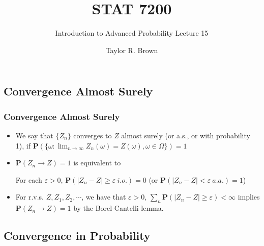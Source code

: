 \documentclass[handout]{beamer}
\title{STAT 7200}
\subtitle{Introduction to Advanced Probability \newline Lecture 15}
\author{Taylor R. Brown}
\institute{}
\date{}
\newcommand{\BP}{\mathbf{P}}
\begin{document}
\frame{\titlepage}

\section[Outline]{}
\frame{\tableofcontents}


\subsection{Convergence Almost Surely}


\frame
{
  \frametitle{Convergence Almost Surely}

   \begin{itemize}
       \item<1-> We say that $\{Z_n\}$ converges to $Z$ almost surely (or a.s., or with probability 1), if $\BP(\{\omega: \lim_{n\rightarrow \infty} Z_n(\omega)= Z(\omega) ,\omega \in \Omega\})=1$ \newline
     
       \item<2->$\BP(Z_n\rightarrow Z)=1$ is equivalent to
       
       For each $\varepsilon>0$, $\BP(|Z_n-Z| \geq \varepsilon \  i.o.)=0$ (or $\BP(|Z_n-Z| < \varepsilon \  a.a.)=1$) \newline
       
       
       \item<3-> For r.v.s. $Z, Z_1, Z_2, \cdots $, we have that $\varepsilon>0$, $\sum_n \BP(|Z_n-Z| \geq \varepsilon)<\infty$ implies $\BP(Z_n\rightarrow Z)=1$ by the Borel-Cantelli lemma.  
                
\end{itemize}
}



\subsection{Convergence in Probability}
\end{document}
